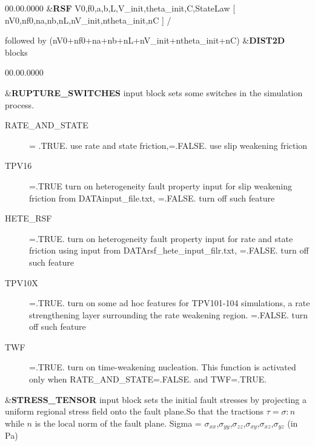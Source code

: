 \begin{lyxlist}{00.00.0000}
\&\textbf{RSF} V0,f0,a,b,L,V\_init,theta\_init,C,StateLaw {[} nV0,nf0,na,nb,nL,nV\_init,ntheta\_init,nC {]} /



followed by (nV0+nf0+na+nb+nL+nV\_init+ntheta\_init+nC) \&\textbf{DIST2D} blocks\\

\begin{lyxlist}{00.00.0000}
\item [{\&\textbf{RUPTURE\_SWITCHES}}] input block sets some switches in the simulation process.
  \begin{description}
    \item [{RATE\_AND\_STATE}]
         = .TRUE. use rate and state friction,=.FALSE. use slip weakening friction
    \item [{TPV16}]
         =.TRUE turn on heterogeneity fault property input for slip weakening friction from DATA\/input\_file.txt,
         =.FALSE. turn off such feature
    \item [{HETE\_RSF}]
         =.TRUE. turn on heterogeneity fault property input for rate and state friction
              using input from DATA\/rsf\_hete\_input\_filr.txt,
   =.FALSE. turn off such feature
    \item[{TPV10X}]
         =.TRUE. turn on some ad hoc features for TPV101-104 simulations, a rate strengthening
   layer surrounding the rate weakening region.
   =.FALSE. turn off such feature
    \item[{TWF}]
         =.TRUE. turn on time-weakening nucleation. This function is activated only when                    
         RATE\_AND\_STATE=.FALSE. and TWF=.TRUE.
   \end{description}

\item [{\&\textbf{STRESS\_TENSOR}}] input block sets the initial fault stresses
  by projecting a uniform regional stress field onto the fault plane.So that the
  tractions $\tau = \sigma : n$ while $n$ is the local norm of the fault plane.
  Sigma =  $\sigma_{xx}$,$\sigma_{yy}$,$\sigma_{zz}$,$\sigma_{xy}$,$\sigma_{xz}$,$\sigma_{yz}$
  (in Pa)


\end{lyxlist}
\end{lyxlist}
